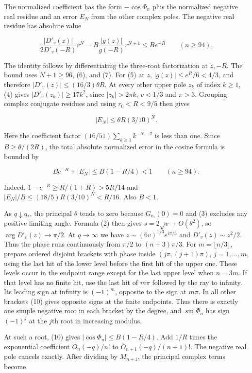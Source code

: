 \documentclass[11pt]{article}
\begin{document}
The normalized coefficient has the form $-\cos\Phi_n$ plus the normalized negative real residue and an error $E_N$ from the other complex poles. The negative real residue has absolute value

\[
\frac{|D'_v(z)|}{2D'_v(-R)}r^N
=B\frac{|g(z)|}{g(-R)}r^{N+1}\le B e^{-R}
\qquad(n\ge94).
\tag{8}
\]

The identity follows by differentiating the three-root factorization at $z,-R$. The bound uses $N+1\ge96$, (6), and (7). For (5) at $z$, $|g(z)|\le e^R/6<4/3$, and therefore $|D'_v(z)|\le(16/3)\theta R$. At every other upper pole $z_k$ of index $k\ge1$, (4) gives $|D'_v(z_k)|\ge17k^2$, since $|z_k|>2\pi k$, $v<1/3$ and $\pi>3$. Grouping complex conjugate residues and using $r_0<R<9/5$ then gives

\[
|E_N|\le \theta R(3/10)^N.
\tag{9}
\]

Here the coefficient factor $(16/51)\sum_{k\ge1}k^{-N-2}$ is less than one. Since $B\ge\theta/(2R)$, the total absolute normalized error in the cosine formula is bounded by

\[
B e^{-R}+|E_N|\le B(1-R/4)<1
\qquad(n\ge94).
\tag{10}
\]

Indeed, $1-e^{-R}\ge R/(1+R)>5R/14$ and $|E_N|/B\le(18/5)R(3/10)^N<R/16$. Also $B<1$.

As $q\downarrow q_*$, the principal $\theta$ tends to zero because $G_{v_*}(0)=0$ and (3) excludes any positive limiting angle. Formula (2) then gives $s=2\sqrt v+O(\theta^2)$, so $\arg D'_v(z)\to\pi/2$. At $q\to\infty$ we have $z\sim(6v)^{1/3}e^{i\pi/3}$ and $D'_v(z)\sim z^2/2$. Thus the phase runs continuously from $\pi/2$ to $(n+3)\pi/3$. For $m=\lfloor n/3\rfloor$, prepare ordered disjoint brackets with phase inside $(j\pi,(j+1)\pi)$, $j=1,\ldots,m$, using the last hit of the lower level before the first hit of the upper one. These levels occur in the endpoint range except for the last upper level when $n=3m$. If that level has no finite hit, use the last hit of $m\pi$ followed by the ray to infinity. Its leading sign at infinity is $(-1)^m$, opposite to the sign at $m\pi$. In all other brackets (10) gives opposite signs at the finite endpoints. Thus there is exactly one simple negative root in each bracket by the degree, and $\sin\Phi_n$ has sign $(-1)^j$ at the $j$th root in increasing modulus.

At such a root, (10) gives $|\cos\Phi_n|\le B(1-R/4)$. Add $1/R$ times the exponential coefficient $O_n(-q)/n!$ to $O_{n+1}(-q)/(n+1)!$. The negative real pole cancels exactly. After dividing by $M_{n+1}$, the principal complex terms become
\end{document}
